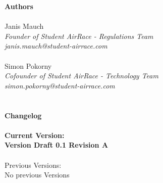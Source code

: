 \documentclass{article}
\begin{document}


\tableofcontents{}

\newpage
{\bf Authors}
\\ \\Janis Mauch \emph{\\Founder of Student AirRace - Regulations Team \\janis.mauch@student-airrace.com}
\\ \\ Simon Pokorny \emph{\\Cofounder of Student AirRace - Technology Team \\simon.pokorny@student-airrace.com}
\\ \\ \\
{\bf Changelog}
\\ \\{\bf Current Version: \\Version Draft 0.1 Revision A}
\\ \\Previous Versions: \\ No previous Versions
\end{document}
